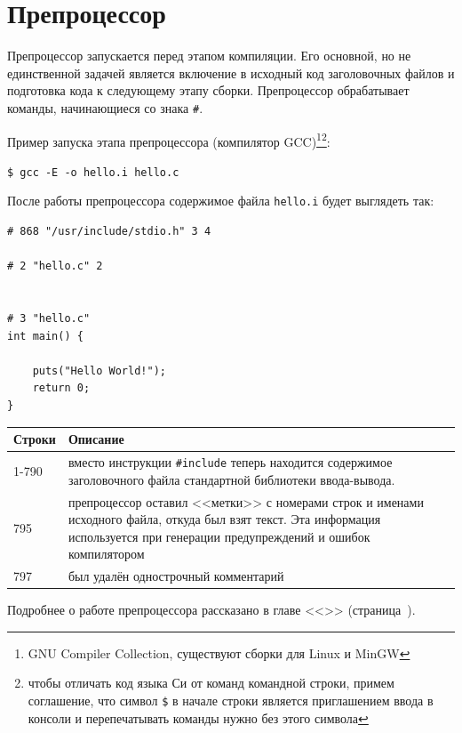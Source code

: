 \documentclass[myc.tex]{subfiles}
\begin{document}
\section{Препроцессор}
Препроцессор запускается перед этапом компиляции. Его основной, но не единственной задачей является включение в исходный код заголовочных файлов и подготовка кода к следующему этапу сборки. Препроцессор обрабатывает команды, начинающиеся со знака \texttt{\#}.

Пример запуска этапа препроцессора (компилятор GCC)\footnote{GNU Compiler Collection, существуют сборки для Linux и MinGW}\footnote{чтобы отличать код языка Си от команд командной строки, примем соглашение, что символ \texttt{\$} в начале строки является приглашением ввода в консоли и перепечатывать команды нужно без этого символа}:

\texttt{\$ gcc -E -o hello.i hello.c}

После работы препроцессора содержимое файла \texttt{hello.i} будет выглядеть так:

\begin{lstlisting}[firstnumber=790]
# 868 "/usr/include/stdio.h" 3 4

# 2 "hello.c" 2


# 3 "hello.c"
int main() {

    puts("Hello World!");
    return 0;
}
\end{lstlisting}
\noindent
\begin{small}
\begin{tabularx}{\textwidth}{|l|X|}
\hline
\textbf{Строки} & \textbf{Описание}\\
\hline
1-790 & вместо инструкции \texttt{\#include} теперь находится содержимое заголовочного файла стандартной библиотеки ввода-вывода.\\
\hline
795 & препроцессор оставил <<метки>> с номерами строк и именами исходного файла, откуда был взят текст. Эта информация используется при генерации предупреждений и ошибок компилятором\\
\hline
797 & был удалён однострочный комментарий\\
\hline
\end{tabularx}
\end{small}



Подробнее о работе препроцессора рассказано в главе <<>> (страница~\pageref{ch:preprocessor}).
\end{document}
